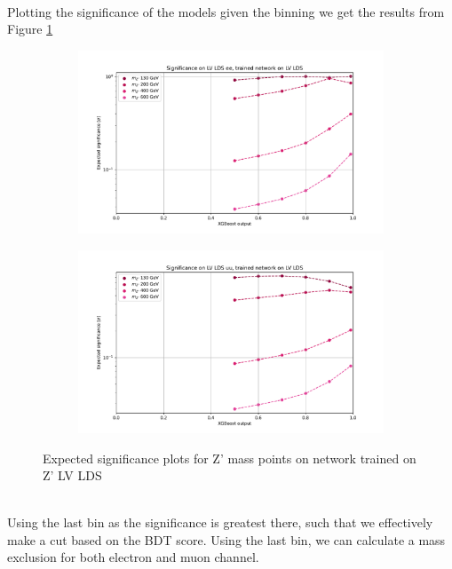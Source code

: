 \documentclass[14pt, a4paper]{book}
\begin{document}
\\Plotting the significance of the models given the binning we get the results from Figure \ref{fig:LV_LDS_exp_sig}
\begin{figure}[!ht]
	\centering
	\begin{subfigure}[b]{0.49\textwidth}
      \centering
      \includegraphics[width=1\textwidth]{XGBoost/LV_LDS/EXP_SIG_ee.pdf}
      \end{subfigure}
   \hfill
   \begin{subfigure}[b]{0.49\textwidth}
      \centering
      \includegraphics[width=1\textwidth]{XGBoost/LV_LDS/EXP_SIG_uu.pdf}
      \end{subfigure}
   \caption{Expected significance plots for Z' mass points on network trained on Z' LV LDS}\label{fig:LV_LDS_exp_sig}
\end{figure}
\\Using the last bin as the significance is greatest there, such that we effectively make a cut based on the BDT score. Using the last bin, we can calculate a mass exclusion for both electron and muon channel.\\
\end{document}
